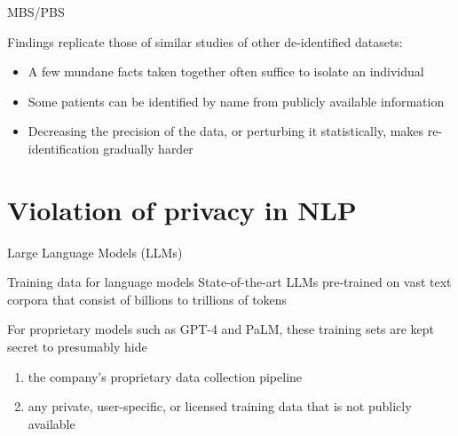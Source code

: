 \documentclass[12pt,aspectratio=169,handout]{beamer}
\begin{document}
\begin{frame}{MBS/PBS}

Findings replicate those of similar studies of other de-identified datasets:
\begin{itemize}
\item A few mundane facts taken together often suffice to isolate an individual
\item Some patients can be identified by name from publicly available information
\item Decreasing the precision of the data, or perturbing it statistically, makes re-identification gradually harder
\end{itemize}


\end{frame}





\section{Violation of privacy in NLP}



\begin{frame}{Large Language Models (LLMs)}

\begin{block}{Training data for language models}
State-of-the-art LLMs pre-trained on vast text corpora that consist of billions to trillions of tokens

For proprietary models such as GPT-4 and PaLM, these training sets are kept secret to presumably hide

\begin{enumerate}
\item the company’s proprietary data collection pipeline
\item any private, user-specific, or licensed training data that is not publicly available
\end{enumerate}
\end{block}


\end{frame}
\end{document}
